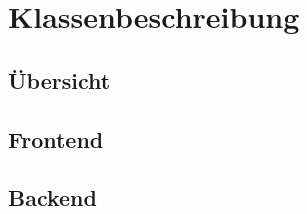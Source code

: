 \section{Klassenbeschreibung}
\subsection{Übersicht}
\subsection{Frontend}










\subsection{Backend}

